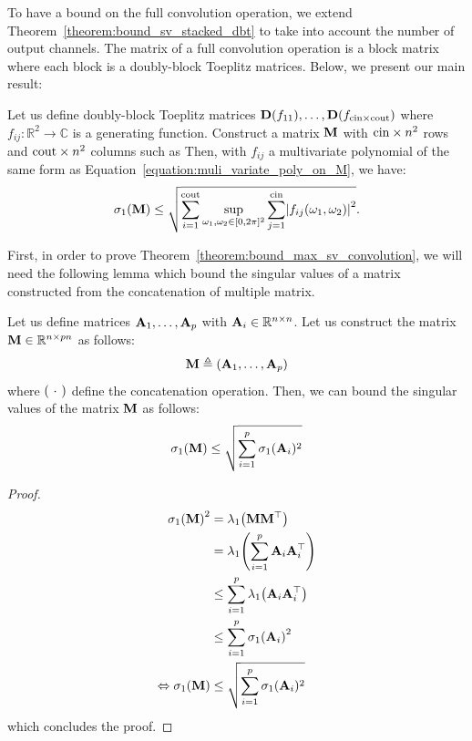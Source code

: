 To have a bound on the full convolution operation, we extend Theorem~\ref{theorem:bound_sv_stacked_dbt} to take into account the number of output channels.
The matrix of a full convolution operation is a block matrix where each block is a doubly-block Toeplitz matrices. Below, we present our main result:

\begin{theorem} \label{theorem:bound_max_sv_convolution} 
Let us define doubly-block Toeplitz matrices $\mathbf{D}(f_{11}), \dots, \mathbf{D}(f_{\mathrm{cin}\times \mathrm{cout}})$ where $f_{ij}: \mathbb{R}^2 \rightarrow \mathbb{C}$ is a generating function. Construct a matrix $\mathbf{M}$ with $\mathrm{cin}\times n^2$ rows and $\mathrm{cout}\times n^2$ columns such as
Then, with $f_{ij}$ a multivariate polynomial of the same form as Equation~\ref{equation:muli_variate_poly_on_M}, we have:
\begin{equation} \label{equation:lipbound_sv}
 \sigma_1 \left( \Mmat \right) \leq \sqrt{ \sum_{i=1}^{\cout} \sup_{\omega_1, \omega_2 \in [0, 2\pi]^2} \sum_{j = 1}^{\cin} \left|f_{ij}(\omega_1, \omega_2) \right|^2 } .
\end{equation} 
\end{theorem}


First, in order to prove Theorem~\ref{theorem:bound_max_sv_convolution}, we will need the following lemma which bound the singular values of a matrix constructed from the concatenation of multiple matrix. 

\begin{lemma} \label{theorem:bound_concatenation_matrices}
Let us define matrices $\mathbf{A}_1, \dots, \mathbf{A}_p$ with $\mathbf{A}_i \in \mathbb{R}^{n \times n}$. Let us construct the matrix $\mathbf{M} \in \mathbb{R}^{n \times pn}$ as follows:
\begin{equation}
    \Mmat \triangleq \leftmat \Amat_1, \dots, \Amat_p \rightmat
\end{equation}
where $\leftmat\ \cdot\ \rightmat$ define the concatenation operation. Then, we can bound the singular values of the matrix $\mathbf{M}$ as follows:
\begin{equation}
    \sigma_1(\mathbf{M}) \leq \sqrt{\sum_{i=1}^p \sigma_1(\mathbf{A}_i)^2}
\end{equation}
\end{lemma}
\begin{proof}
\begin{align}
    \sigma_1\left(\Mmat\right)^2 &= \lambda_1\left(\Mmat \Mmat^\top\right) \\
    &= \lambda_1\left( \sum_{i=1}^p\Amat_i \Amat_i^\top  \right) \\
    &\leq \sum_{i=1}^p \lambda_1\left( \Amat_i \Amat_i^\top  \right) \\
    &\leq \sum_{i=1}^p \sigma_1\left( \Amat_i \right)^2 \\
    \Leftrightarrow \sigma_1\left(\Mmat\right) &\leq \sqrt{\sum_{i=1}^p \sigma_1(\Amat_i)^2}
\end{align}
which concludes the proof.
\end{proof}


